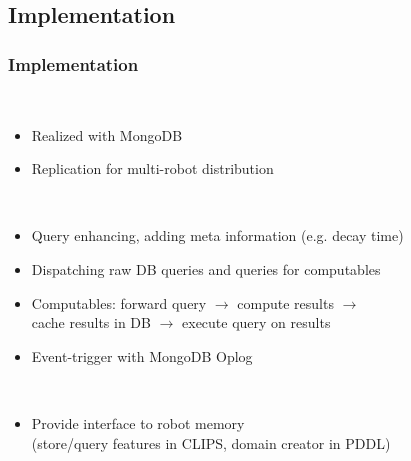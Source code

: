 \subsection{Implementation}
\begin{frame}
  \frametitle{Implementation}
  \begin{description}[]
  \item[Back-End] \hfill \\
    \begin{itemize}
    \item Realized with MongoDB
    \item Replication for multi-robot distribution
    \end{itemize}
  \smallskip
  \pause
  \item[Robot Memory] \hfill \\
    \begin{itemize}
    \item Query enhancing, adding meta information (e.g. decay time)
    \item Dispatching raw DB queries and queries for computables
    \item Computables: forward query $\rightarrow$ compute results $\rightarrow$ \\
          cache results in DB $\rightarrow$ execute query on results
    \item Event-trigger with MongoDB Oplog
    \end{itemize}
  \smallskip
  \pause
  \item[Planner/Reasoner] \hfill \\
    \begin{itemize}
    \item Provide interface to robot memory\\
          (store/query features in CLIPS, domain creator in PDDL)
    \end{itemize}
  \end{description}  
\end{frame}

